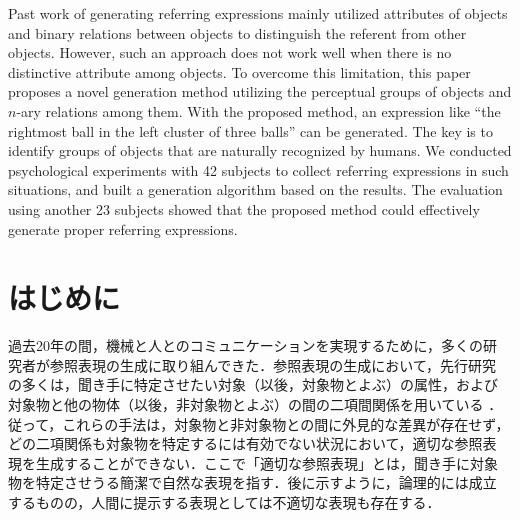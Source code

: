 \documentclass{nlp}
\begin{document}
\begin{eabstract}
  Past work of generating referring expressions mainly utilized
  attributes of objects and binary relations between objects to
  distinguish the referent from other objects. However, such an
  approach does not work well when there is no distinctive attribute
  among objects. To overcome this limitation, this paper proposes a
  novel generation method utilizing the perceptual groups of objects
  and $n$-ary relations among them. With the proposed method, an
  expression like ``the rightmost ball in the left cluster of three
  balls'' can be generated. The key is to identify groups of objects
  that are naturally recognized by humans. We conducted psychological
  experiments with 42 subjects to collect referring expressions in
  such situations, and built a generation algorithm based on the
  results. The evaluation using another 23 subjects showed that the
  proposed method could effectively generate proper referring
  expressions.
\end{eabstract}


\maketitle

\def\Fig#1{}
\def\Tab#1{}
\def\Sec#1{}
\def\App#1{}
\def\mi#1{}
\def\ti#1{}
\def\func#1{}


\section{はじめに}
\label{sec:intro}

過去20年の間，機械と人とのコミュニケーションを実現するために，多くの研
究者が参照表現の生成に取り組んできた．参照表現の生成において，先行研究
の多くは，聞き手に特定させたい対象（以後，対象物とよぶ）の属性，および
対象物と他の物体（以後，非対象物とよぶ）の間の二項間関係を用いている
\cite{DA1985,RD1991,RD1992,RD1995,PH1995,HH1997,EK2002,KV2002,EK2003}．
従って，これらの手法は，対象物と非対象物との間に外見的な差異が存在せず，
どの二項関係も対象物を特定するには有効でない状況において，適切な参照表
現を生成することができない．ここで「適切な参照表現」とは，聞き手に対象
物を特定させうる簡潔で自然な表現を指す．後に示すように，論理的には成立
するものの，人間に提示する表現としては不適切な表現も存在する．
\end{document}
